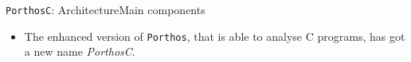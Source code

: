 \documentclass[aspectratio=149]{beamer}
\newcommand{\tool}[1]{\texttt{#1}}
\begin{document}
\begin{frame}{\tool{PorthosC}: Architecture}{Main components}
\vspace{-30pt}
\begin{minipage}{.49\textwidth}
\begin{itemize}
\item The enhanced version of \tool{Porthos}, that is able to analyse C programs, has got a new name \textit{PorthosC}.
\end{itemize}
\hfill
\end{minipage}
%
\begin{minipage}{.5\textwidth}
\end{minipage}
\end{frame}
\end{document}
